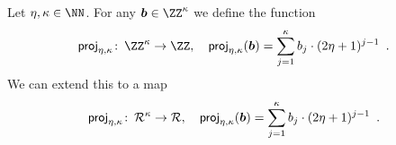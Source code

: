 \begin{definition}\label{def:proj}
  Let $\eta,\limbs\in\NN$.
  For any $\vec{b} \in \ZZ^{\limbs}$ we define the function 
  \[
    \projring\colon\, \ZZ^{\limbs} \to \ZZ,\quad \projring(\vec{b}) = \smashoperator{\sum_{j=1}^{\limbs}} b_j\cdot(2\eta+1)^{j-1}\enspace.
  \]
  We can extend this to a map 
  \[
    \projring\colon\, \ring^{\limbs} \to \ring,\quad \projring(\vec{b}) = \smashoperator{\sum_{j=1}^{\limbs}} b_j\cdot(2\eta+1)^{j-1}\enspace.
  \]
\end{definition}

